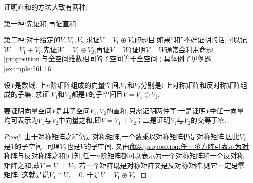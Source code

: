\documentclass[../../main.tex]{subfiles}%
\begin{document}
\begin{conclusion}
证明直和的方法大致有两种:

第一种:先证和,再证直和. 

第二种:对于给定的\(V,V_1,V_2\),求证\(V = V_1\oplus V_2\)的题目,如果“和”不好证明的话,可以记\(W = V_1 + V_2\),先证\(W = V_1\oplus V_2\),再证\(V = W\)(证明\(V = W\)通常会利用\hyperref[proposition:与全空间维数相同的子空间等于全空间]{命题\ref{proposition:与全空间维数相同的子空间等于全空间}}).具体例子见\hyperref[example:561.16]{例题\ref{example:561.16}}
\end{conclusion}

\begin{proposition}\label{proposition:矩阵空间可以分解为对称和反称矩阵空间的直和}
设\(V\)是数域\(\mathbb{F}\)上\(n\)阶矩阵组成的向量空间,\(V_1\)和\(V_2\)分别是\(\mathbb{F}\)上对称矩阵和反对称矩阵组成的子集. 求证:\(V_1\)和\(V_2\)都是\(V\)的子空间且\(V = V_1\oplus V_2\).
\end{proposition}
\begin{note}
要证明向量空间\(V\)是其子空间\(V_1,V_2\)的直和,只需证明两件事:一是证明\(V\)中任一向量均可表示为\(V_1\)与\(V_2\)中向量之和,即\(V = V_1 + V_2\)；二是证明\(V_1\)与\(V_2\)的交等于零.
\end{note}
\begin{proof}

由于对称矩阵之和仍是对称矩阵,一个数乘以对称矩阵仍是对称矩阵,因此\(V_1\)是\(V\)的子空间. 同理\(V_2\)也是\(V\)的子空间. 又由\hyperref[proposition:任一阶方阵可表示为对称阵与反对称阵之和]{命题\ref{proposition:任一阶方阵可表示为对称阵与反对称阵之和}}可知,任一\(n\)阶矩阵都可以表示为一个对称矩阵和一个反对称矩阵之和,故\(V = V_1 + V_2\). 若一个矩阵既是对称矩阵又是反对称矩阵,则它一定是零矩阵. 这就是说\(V_1\cap V_2 =0\). 于是\(V = V_1\oplus V_2\). 

\end{proof}
\end{document}
